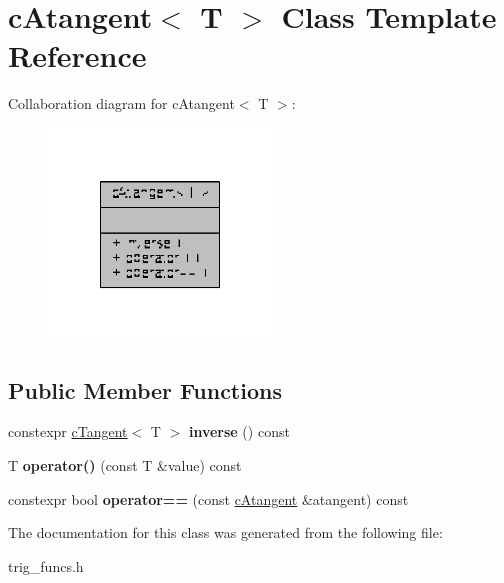 \hypertarget{classcAtangent}{\section{c\-Atangent$<$ T $>$ Class Template Reference}
\label{classcAtangent}
}


Collaboration diagram for c\-Atangent$<$ T $>$\-:
\nopagebreak
\begin{figure}[H]
\begin{center}
\leavevmode
\includegraphics[width=168pt]{classcAtangent__coll__graph}
\end{center}
\end{figure}
\subsection*{Public Member Functions}
\begin{DoxyCompactItemize}
\item 
\hypertarget{classcAtangent_a3f240c929f1ee8fcdd6c820a0302529f}{constexpr \hyperlink{classcTangent}{c\-Tangent}$<$ T $>$ {\bfseries inverse} () const }\label{classcAtangent_a3f240c929f1ee8fcdd6c820a0302529f}

\item 
\hypertarget{classcAtangent_ad8abce7c7a9d1e5a08ffe041eef07ba2}{T {\bfseries operator()} (const T \&value) const }\label{classcAtangent_ad8abce7c7a9d1e5a08ffe041eef07ba2}

\item 
\hypertarget{classcAtangent_ab64f07f0963f727f47c7e92d2ffc5be8}{constexpr bool {\bfseries operator==} (const \hyperlink{classcAtangent}{c\-Atangent} \&atangent) const }\label{classcAtangent_ab64f07f0963f727f47c7e92d2ffc5be8}

\end{DoxyCompactItemize}


The documentation for this class was generated from the following file\-:\begin{DoxyCompactItemize}
\item 
trig\-\_\-funcs.\-h\end{DoxyCompactItemize}
